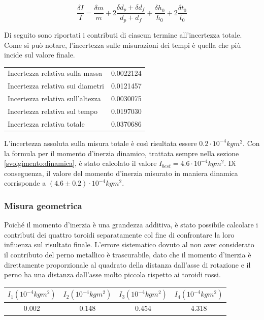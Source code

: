 \documentclass{article}
\begin{document}
$$ \frac{\delta I}{I} = \frac{\delta m}{m} + 2\frac{\delta d_p + \delta d_f}{d_p + d_f} + \frac{\delta h_0}{h_0} + 2\frac{\delta t_0}{t_0} $$

Di seguito sono riportati i contributi di ciascun termine all'incertezza totale. Come si può notare, l'incertezza sulle misurazioni dei tempi è quella che più incide sul valore finale.

\begin{center}
\begin{tabular}{|l|c|}
\hline
Incertezza relativa sulla massa & 0.0022124 \\
Incertezza relativa sui diametri & 0.0121457 \\
Incertezza relativa sull'altezza & 0.0030075 \\
Incertezza relativa sul tempo & 0.0197030 \\
\hline
Incertezza relativa totale & 0.0370686 \\
\hline
\end{tabular}
\end{center}

L'incertezza assoluta sulla misura totale è così risultata essere $0.2 \cdot 10^{-4}kgm^2$. Con la formula per il momento d'inerzia dinamico, trattata sempre nella sezione \ref{svolgimento:dinamica}, è stato calcolato il valore $I_{best}=4.6 \cdot 10^{-4}kgm^2$. Di conseguenza, il valore del momento d'inerzia misurato in maniera dinamica corrisponde a $(4.6 \pm 0.2) \cdot 10^{-4}kgm^2$.

\subsubsection{Misura geometrica}
Poiché il momento d'inerzia è una grandezza additiva, è stato possibile calcolare i contributi dei quattro toroidi separatamente col fine di confrontare la loro influenza sul risultato finale. L'errore sistematico dovuto al non aver considerato il contributo del perno metallico è trascurabile, dato che il momento d'inerzia è direttamente proporzionale al quadrato della distanza dall'asse di rotazione e il perno ha una distanza dall'asse molto piccola rispetto ai toroidi rossi.

\begin{center}
\begin{tabular}{|c|c|c|c|}
\hline
$I_1 (10^{-4}kgm^2)$ & $I_2 (10^{-4}kgm^2)$ & $I_3 (10^{-4}kgm^2)$ & $I_4 (10^{-4}kgm^2)$ \\
\hline
0.002 & 0.148 & 0.454 & 4.318 \\
\hline
\end{tabular}
\end{center}
\end{document}
